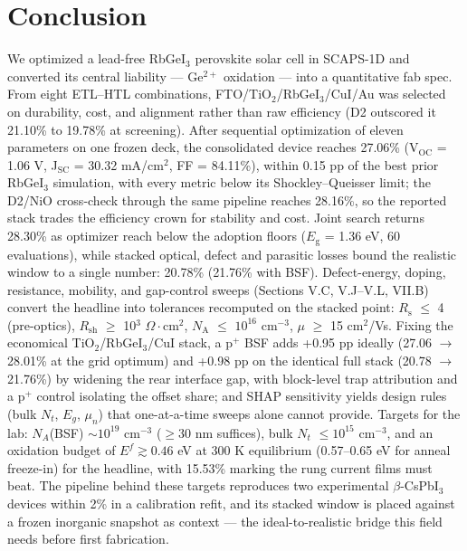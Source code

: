 \documentclass[aip,amsmath,amssymb,preprint]{revtex4-2}
\begin{document}
\section{Conclusion}
We optimized a lead-free RbGeI$_{3}$ perovskite solar cell in SCAPS-1D and converted its central liability --- Ge$^{2+}$ oxidation --- into a quantitative fab spec. From eight ETL--HTL combinations, FTO/\allowbreak{}TiO$_{2}$/RbGeI$_{3}$/CuI/\allowbreak{}Au was selected on durability, cost, and alignment rather than raw efficiency (D2 outscored it 21.10\% to 19.78\% at screening).
After sequential optimization of eleven parameters on one frozen deck, the consolidated device reaches 27.06\% (V$_{\mathrm{OC}}$ = 1.06 V, J$_{\mathrm{SC}}$ = 30.32 mA/cm$^{2}$, FF = 84.11\%), within 0.15 pp of the best prior RbGeI$_{3}$ simulation, with every metric below its Shockley--Queisser limit; the D2/NiO cross-check through the same pipeline reaches 28.16\%, so the reported stack trades the efficiency crown for stability and cost. Joint search returns 28.30\% as optimizer reach below the adoption floors ($E_{\mathrm{g}}$ = 1.36 eV, 60 evaluations), while stacked optical, defect and parasitic losses bound the realistic window to a single number: 20.78\% (21.76\% with BSF). Defect-energy, doping, resistance, mobility, and gap-control sweeps (Sections V.C, V.J--V.L, VII.B) convert the headline into tolerances recomputed on the stacked point: $R_{\mathrm{s}}$ $\le$ 4 (pre-optics), $R_{\mathrm{sh}}$ $\ge$ 10$^{3}$ $\Omega\cdot$cm$^{2}$, $N_{\mathrm{A}}$ $\le$ $10^{16}$ cm$^{-3}$, $\mu$ $\ge$ 15 cm$^{2}$/Vs. Fixing the economical TiO$_{2}$/RbGeI$_{3}$/CuI stack, a p$^{+}$ BSF adds +0.95 pp ideally (27.06 $\rightarrow$ 28.01\% at the grid optimum) and +0.98 pp on the identical full stack (20.78 $\rightarrow$ 21.76\%) by widening the rear interface gap, with block-level trap attribution and a p$^{+}$ control isolating the offset share; and SHAP sensitivity yields design rules (bulk $N_{t}$, $E_{g}$, $\mu_{n}$) that one-at-a-time sweeps alone cannot provide. Targets for the lab: $N_{A}$(BSF) $\sim$$10^{19}$ cm$^{-3}$ ($\ge$30 nm suffices), bulk $N_{t}$ $\le$$10^{15}$ cm$^{-3}$, and an oxidation budget of $E^f\gtrsim0.46$ eV at 300 K equilibrium (0.57--0.65 eV for anneal freeze-in) for the headline, with 15.53\% marking the rung current films must beat. The pipeline behind these targets reproduces two experimental $\beta$-CsPbI$_{3}$ devices within 2\% in a calibration refit, and its stacked window is placed against a frozen inorganic snapshot as context --- the ideal-to-realistic bridge this field needs before first fabrication.
\end{document}
